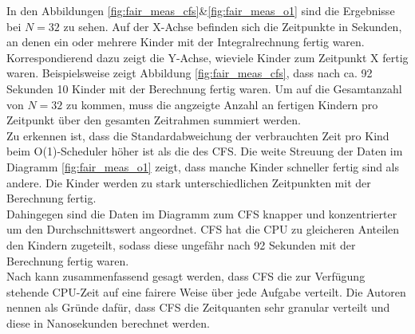 In den Abbildungen \ref{fig:fair_meas_cfs}\&\ref{fig:fair_meas_o1} sind die Ergebnisse bei $N=32$ zu sehen. Auf der X-Achse befinden sich die Zeitpunkte in Sekunden, an denen ein oder mehrere Kinder mit der Integralrechnung fertig waren. Korrespondierend dazu zeigt die Y-Achse, wieviele Kinder zum Zeitpunkt X fertig waren. Beispielsweise zeigt Abbildung \ref{fig:fair_meas_cfs}, dass nach ca. 92 Sekunden 10 Kinder mit der Berechnung fertig waren. Um auf die Gesamtanzahl von $N=32$ zu kommen, muss die angzeigte Anzahl an fertigen Kindern pro Zeitpunkt über den gesamten Zeitrahmen summiert werden. \\
Zu erkennen ist, dass die Standardabweichung der verbrauchten Zeit pro Kind beim O(1)-Scheduler höher ist als die des CFS. Die weite Streuung der Daten im Diagramm \ref{fig:fair_meas_o1} zeigt, dass manche Kinder schneller fertig sind als andere. Die Kinder werden zu stark unterschiedlichen Zeitpunkten mit der Berechnung fertig.\\
Dahingegen sind die Daten im Diagramm zum CFS knapper und konzentrierter um den Durchschnittswert angeordnet. CFS hat die CPU zu gleicheren Anteilen den Kindern zugeteilt, sodass diese ungefähr nach 92 Sekunden mit der Berechnung fertig waren. \\
Nach \cite{papercomparison} kann zusammenfassend gesagt werden, dass CFS die zur Verfügung stehende CPU-Zeit auf eine fairere Weise über jede Aufgabe verteilt. Die Autoren nennen als Grün\-de dafür, dass CFS die Zeitquanten sehr granular verteilt und diese in Nanosekunden berechnet werden.

